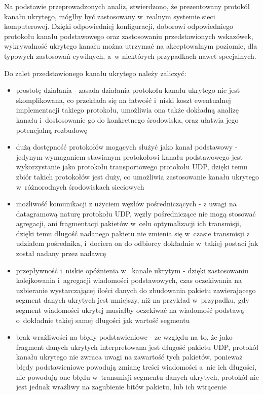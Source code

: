 \documentclass[a4paper, twoside, 12pt]{report}
\begin{document}
    Na podstawie przeprowadzonych analiz, stwierdzono, że prezentowany protokół
    kanału ukrytego, mógłby być zastosowany w~realnym systemie sieci komputerowej.
    Dzięki odpowiedniej konfiguracji, doborowi odpowiedniego protokołu kanału
    podstawowego oraz zastosowaniu przedstawionych wskazówek,
    wykrywalność ukrytego kanału można utrzymać na akceptowalnym
    poziomie, dla typowych zastosowań cywilnych, a~w niektórych przypadkach nawet specjalnych.

    Do zalet przedstawionego kanału ukrytego należy zaliczyć:
    \begin{itemize}
        \item prostotę działania - zasada działania protokołu kanału ukrytego
            nie jest skomplikowana, co przekłada się na łatwość i~niski koszt
            ewentualnej implementacji takiego protokołu, umożliwia ona także
            dokładną analizę kanału i~dostosowanie go do konkretnego środowiska,
            oraz ułatwia jego potencjalną rozbudowę
        \item dużą dostępność protokołów mogących służyć jako kanał podstawowy -
            jedynym wymaganiem stawianym protokołowi kanału podstawowego jest
            wykorzystanie jako protokołu transportowego protokołu UDP, dzięki temu
            zbiór takich protokołów jest duży, co umożliwia zastosowanie kanału
            ukrytego w~różnorodnych środowiskach sieciowych
        \item możliwość komunikacji z użyciem węzłów pośredniczących - z uwagi
            na datagramową naturę protokołu UDP, węzły pośredniczące nie mogą stosować
            agregacji, ani fragmentacji pakietów w~celu optymalizacji ich transmisji,
            dzięki temu długość nadanego pakietu nie zmienia się w~czasie transmisji
            z udziałem pośrednika, i~dociera on do odbiorcy dokładnie w~takiej postaci
            jak został nadany przez nadawcę
        \item przepływność i~niskie opóźnienia w~ kanale ukrytym - dzięki
            zastosowaniu kolejkowania i~agregacji wiadomości podstawowych,
            czas oczekiwania na uzbieranie wystarczającej ilości danych do zbudowania
            pakietu zawierającego segment danych ukrytych jest mniejszy, niż na przykład
            w~przypadku, gdy segment wiadomości ukrytej musiałby oczekiwać na
            wiadomość podstawą o~dokładnie takiej samej długości jak wartość segmentu
        \item brak wrażliwości na błędy podstawieniowe - ze względu na to, że jako
            fragment danych ukrytych interpretowana jest długość pakietu UDP, protokół
            kanału ukrytego nie zwraca uwagi na zawartość tych pakietów, ponieważ
            błędy podstawieniowe powodują zmianę treści wiadomości a~nie ich długości,
            nie powodują one błędu w~transmisji segmentu danych ukrytych, protokół
            nie jest jednak wrażliwy na zagubienie bitów pakietu, lub ich wtrącenie
    \end{itemize}
\end{document}
